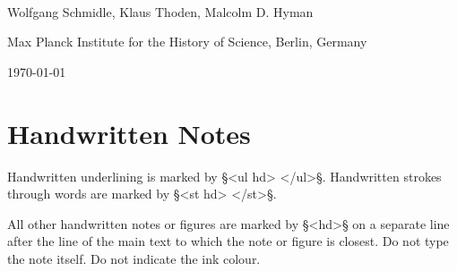 \documentclass[fontsize=11pt, paper=a4, 
DIV15,
headings=normal, %
parskip=half-,
numbers=noenddot %
]{scrartcl}
\begin{document}
\begin{center}
{} \\[5mm]
\large Wolfgang Schmidle, Klaus Thoden, Malcolm D. Hyman

\normalsize Max Planck Institute for the History of Science, Berlin, Germany

\today
\end{center}


\section{Handwritten Notes}

\begin{mainrule}
Handwritten underlining is marked by §<ul hd> </ul>§. Handwritten strokes through words are marked by §<st hd> </st>§. 
\end{mainrule}




\begin{clarification}
All other handwritten notes or figures are marked by §<hd>§ on a separate line after the line of the main text to which the note or figure is closest. Do not type the note itself. Do not indicate the ink colour.
\end{clarification}
\end{document}
